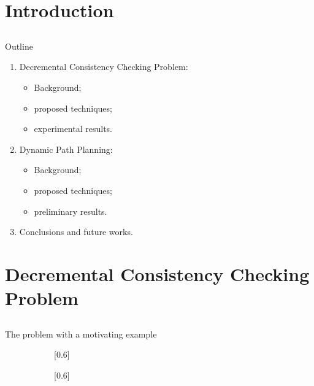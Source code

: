 \documentclass[utf8, a4paper]{beamer}
\title{\TheTitle{}}
\author{%
	{\TheAuthor{}}\\%
	{Tutor: Alfonso Emilio Gerevini}\\%
	{XXXII cycle, \mdQuote{Ingegneria Informatica ed Automatica} Curriculum}\\%
	{email: \code{mbono@unibs.it}}\\%
	\vspace{0.3cm}%
	\texttt{[image: logo\_big]}\\%
}
\begin{document}
	
{
	\begin{frame}[plain]
		\titlepage
	\end{frame}
}


\section{Introduction}

\subsection{}
\begin{frame}{Outline}
	\begin{enumerate}
		\item Decremental Consistency Checking Problem:
			\begin{itemize}
				\item Background;
				\item proposed techniques;
				\item experimental results.
			\end{itemize}
		\item Dynamic Path Planning:
			\begin{itemize}
				\item Background;
				\item proposed techniques;
				\item preliminary results.
			\end{itemize}
		\item Conclusions and future works.
	\end{enumerate}
\end{frame}

\section{Decremental Consistency Checking Problem}

\subsection{}
\begin{frame}{The problem with a motivating example}
	\begin{figure}
		\centering
		\begin{subfigure}{0.5\textwidth}%
			[0.6]%
		\end{subfigure}\hfill%
		\begin{subfigure}{0.5\textwidth}%
			[0.6]%
		\end{subfigure}%
	\end{figure}
	
\end{frame}
\end{document}
